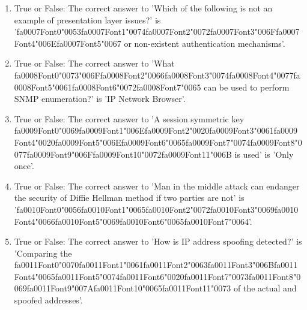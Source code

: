 \documentclass[12pt]{article}
\begin{document}
\begin{enumerate}[label=\arabic*.]
\item True or False: The correct answer to 'Which of the following is not an example of presentation layer issues?' is '{\csname fa0007Font0\endcsname\char"0053}{\csname fa0007Font1\endcsname\char"0074}{\csname fa0007Font2\endcsname\char"0072}{\csname fa0007Font3\endcsname\char"006F}{\csname fa0007Font4\endcsname\char"006E}{\csname fa0007Font5\endcsname\char"0067} or non-existent authentication mechanisms'.
\item True or False: The correct answer to 'What {\csname fa0008Font0\endcsname\char"0073}{\char"006F}{\csname fa0008Font2\endcsname\char"0066}{\csname fa0008Font3\endcsname\char"0074}{\csname fa0008Font4\endcsname\char"0077}{\csname fa0008Font5\endcsname\char"0061}{\csname fa0008Font6\endcsname\char"0072}{\csname fa0008Font7\endcsname\char"0065} can be used to perform SNMP enumeration?' is 'IP Network Browser'.
\item True or False: The correct answer to 'A session symmetric key {\csname fa0009Font0\endcsname\char"0069}{\csname fa0009Font1\endcsname\char"006E}{\csname fa0009Font2\endcsname\char"0020}{\csname fa0009Font3\endcsname\char"0061}{\csname fa0009Font4\endcsname\char"0020}{\csname fa0009Font5\endcsname\char"006E}{\csname fa0009Font6\endcsname\char"0065}{\csname fa0009Font7\endcsname\char"0074}{\csname fa0009Font8\endcsname\char"0077}{\csname fa0009Font9\endcsname\char"006F}{\csname fa0009Font10\endcsname\char"0072}{\csname fa0009Font11\endcsname\char"006B} is used' is 'Only once'.
\item True or False: The correct answer to 'Man in the middle attack can endanger the security of Diffie Hellman method if two parties are not' is '{\csname fa0010Font0\endcsname\char"0056}{\csname fa0010Font1\endcsname\char"0065}{\csname fa0010Font2\endcsname\char"0072}{\csname fa0010Font3\endcsname\char"0069}{\csname fa0010Font4\endcsname\char"0066}{\csname fa0010Font5\endcsname\char"0069}{\csname fa0010Font6\endcsname\char"0065}{\csname fa0010Font7\endcsname\char"0064}'.
\item True or False: The correct answer to 'How is IP address spoofing detected?' is 'Comparing the {\csname fa0011Font0\endcsname\char"0070}{\csname fa0011Font1\endcsname\char"0061}{\csname fa0011Font2\endcsname\char"0063}{\csname fa0011Font3\endcsname\char"006B}{\csname fa0011Font4\endcsname\char"0065}{\csname fa0011Font5\endcsname\char"0074}{\csname fa0011Font6\endcsname\char"0020}{\csname fa0011Font7\endcsname\char"0073}{\csname fa0011Font8\endcsname\char"0069}{\csname fa0011Font9\endcsname\char"007A}{\csname fa0011Font10\endcsname\char"0065}{\csname fa0011Font11\endcsname\char"0073} of the actual and spoofed addresses'.

\end{enumerate}
\end{document}
